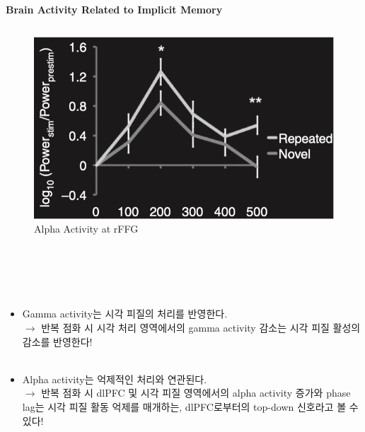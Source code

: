 \documentclass{beamer}
\begin{document}
\begin{frame}{\textbf{Brain Activity Related to Implicit Memory}}
\begin{columns}
    \hfill
    \begin{column}{0.38\textwidth}
      \centering
      \begin{figure}
        \centering
        \includegraphics[width=\textwidth]{image/alpha_im}
        \caption{Alpha Activity at rFFG}
      \end{figure}
    \end{column}
  \end{columns}
\end{frame}

\begin{frame}
  \begin{block}{}
    \large\\~\\~\\
    \begin{itemize}
      \item Gamma activity는 시각 피질의 처리를 반영한다.\\
        $\rightarrow$ {\color{red} 반복 점화 시 시각 처리 영역에서의 gamma activity 감소는 시각 피질 활성의 감소를 반영한다!}\\~\\

      \item Alpha activity는 억제적인 처리와 연관된다.\\
        $\rightarrow$ 반복 점화 시 dlPFC 및 시각 피질 영역에서의 {\color{red} alpha activity 증가와 phase lag는 시각 피질 활동 억제를 매개하는, dlPFC로부터의 top-down 신호라고 볼 수 있다!}
    \end{itemize}\\~\\~\\
  \end{block}
\end{frame}
\end{document}
